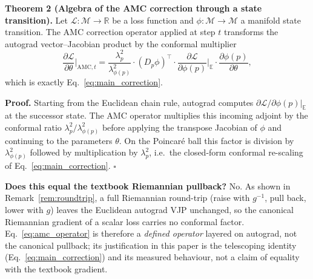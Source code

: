 \documentclass[a4paper,fleqn]{cas-dc}
\begin{document}
\textbf{Theorem 2 (Algebra of the AMC correction through a state transition).} Let $\mathcal{L}: \mathcal{M} \to \mathbb{R}$ be a loss function and $\phi: \mathcal{M} \to \mathcal{M}$ a manifold state transition. The AMC correction operator applied at step $t$ transforms the autograd vector--Jacobian product by the conformal multiplier
\begin{equation}
\frac{\partial\mathcal{L}}{\partial\theta}\bigg|_{\text{AMC},t}
 = \frac{\lambda_p^2}{\lambda_{\phi(p)}^2} \cdot
   (D_p\phi)^\top \cdot
   \frac{\partial\mathcal{L}}{\partial\phi(p)}\bigg|_{\mathbb{E}} \cdot
   \frac{\partial\phi(p)}{\partial\theta},
\label{eq:amc_operator}
\end{equation}
which is exactly Eq.~\eqref{eq:main_correction}.

\textbf{Proof.} Starting from the Euclidean chain rule, autograd computes $\partial\mathcal{L}/\partial\phi(p)|_{\mathbb{E}}$ at the successor state. The AMC operator multiplies this incoming adjoint by the conformal ratio $\lambda_p^2/\lambda_{\phi(p)}^2$ before applying the transpose Jacobian of $\phi$ and continuing to the parameters $\theta$. On the Poincar\'e ball this factor is division by $\lambda_{\phi(p)}^2$ followed by multiplication by $\lambda_p^2$, i.e.\ the closed-form conformal re-scaling of Eq.~\eqref{eq:main_correction}. $\square$

\noindent\textbf{Does this equal the textbook Riemannian pullback?} No. As shown in Remark~\ref{rem:roundtrip}, a full Riemannian round-trip (raise with $g^{-1}$, pull back, lower with $g$) leaves the Euclidean autograd VJP unchanged, so the canonical Riemannian gradient of a scalar loss carries no conformal factor. Eq.~\eqref{eq:amc_operator} is therefore a \emph{defined operator} layered on autograd, not the canonical pullback; its justification in this paper is the telescoping identity (Eq.~\eqref{eq:main_correction}) and its measured behaviour, not a claim of equality with the textbook gradient.
\end{document}
